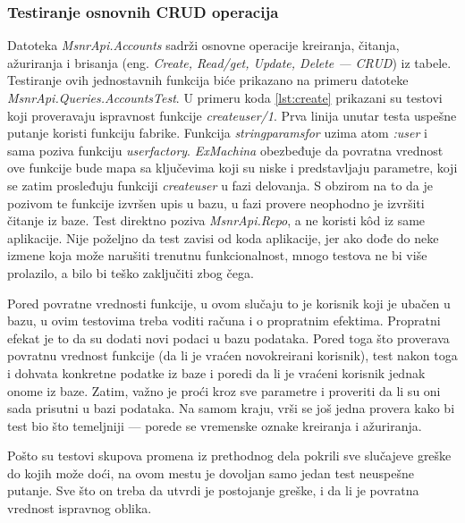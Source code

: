 \documentclass[12pt,oneside]{memoir}
\begin{document}
\subsubsection{Testiranje osnovnih CRUD operacija}

\par Datoteka \emph{MsnrApi.Accounts} sadrži osnovne operacije kreiranja, čitanja, ažuriranja i brisanja (eng. \emph{Create, Read/get, Update, Delete --- CRUD}) iz tabele. Testiranje ovih jednostavnih funkcija biće prikazano na primeru datoteke \emph{MsnrApi.Queries.AccountsTest}. U primeru koda \ref{lst:create} prikazani su testovi koji proveravaju ispravnost funkcije \emph{create{\textunderscore}user/1}. Prva linija unutar testa uspešne putanje koristi funkciju fabrike. Funkcija \emph{string{\textunderscore}params{\textunderscore}for} uzima atom \emph{:user} i sama poziva funkciju \emph{user{\textunderscore}factory}. \emph{ExMachina} obezbeđuje da povratna vrednost ove funkcije bude mapa sa ključevima koji su niske i predstavljaju parametre, koji se zatim prosleđuju funkciji \emph{create{\textunderscore}user} u fazi delovanja. S obzirom na to da je pozivom te funkcije izvršen upis u bazu, u fazi provere neophodno je izvršiti čitanje iz baze. Test direktno poziva \emph{MsnrApi.Repo}, a ne koristi k\^{o}d iz same aplikacije. Nije poželjno da test zavisi od koda aplikacije, jer ako dođe do neke izmene koja može narušiti trenutnu funkcionalnost, mnogo testova ne bi više prolazilo, a bilo bi teško zaključiti zbog čega.  
\par Pored povratne vrednosti funkcije, u ovom slučaju to je korisnik koji je ubačen u bazu, u ovim testovima treba voditi računa i o propratnim efektima. Propratni efekat je to da su dodati novi podaci u bazu podataka. Pored toga što proverava povratnu vrednost funkcije (da li je vraćen novokreirani korisnik), test nakon toga i dohvata konkretne podatke iz baze i poredi da li je vraćeni korisnik jednak onome iz baze. Zatim, važno je proći kroz sve parametre i proveriti da li su oni sada prisutni u bazi podataka. Na samom kraju, vrši se još jedna provera kako bi test bio što temeljniji --- porede se vremenske oznake kreiranja i ažuriranja.
\par Pošto su testovi skupova promena iz prethodnog dela pokrili sve slučajeve greške do kojih može doći, na ovom mestu je dovoljan samo jedan test neuspešne putanje. Sve što on treba da utvrdi je postojanje greške, i da li je povratna vrednost ispravnog oblika. \\
\end{document}
